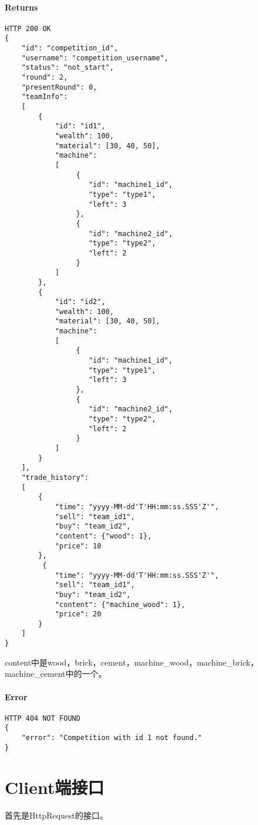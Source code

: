 \documentclass{article}
\begin{document}
\paragraph*{Returns}
\begin{lstlisting}
HTTP 200 OK
{
    "id": "competition_id",
    "username": "competition_username",
    "status": "not_start",
    "round": 2,
    "presentRound": 0,
    "teamInfo":
    [
        {
            "id": "id1",
            "wealth": 100,
            "material": [30, 40, 50],
            "machine":
            [
                 {
                    "id": "machine1_id",
                    "type": "type1",
                    "left": 3
                 },
                 {
                    "id": "machine2_id",
                    "type": "type2",
                    "left": 2
                 }
            ]
        },
        {
            "id": "id2",
            "wealth": 100,
            "material": [30, 40, 50],
            "machine":
            [
                 {
                    "id": "machine1_id",
                    "type": "type1",
                    "left": 3
                 },
                 {
                    "id": "machine2_id",
                    "type": "type2",
                    "left": 2
                 }
            ]
        }
    ],
    "trade_history":
    [
        {
            "time": "yyyy-MM-dd'T'HH:mm:ss.SSS'Z'",
            "sell": "team_id1",
            "buy": "team_id2",
            "content": {"wood": 1},
            "price": 10
        },
         {
            "time": "yyyy-MM-dd'T'HH:mm:ss.SSS'Z'",
            "sell": "team_id1",
            "buy": "team_id2",
            "content": {"machine_wood": 1},
            "price": 20
        }
    ]
}

\end{lstlisting}
content中是wood，brick，cement，machine\_wood，machine\_brick，machine\_cement中的一个。

\paragraph*{Error}
\begin{lstlisting}
HTTP 404 NOT FOUND
{
    "error": "Competition with id 1 not found."
}
\end{lstlisting}

\section{Client端接口}
首先是HttpRequest的接口。
\end{document}
